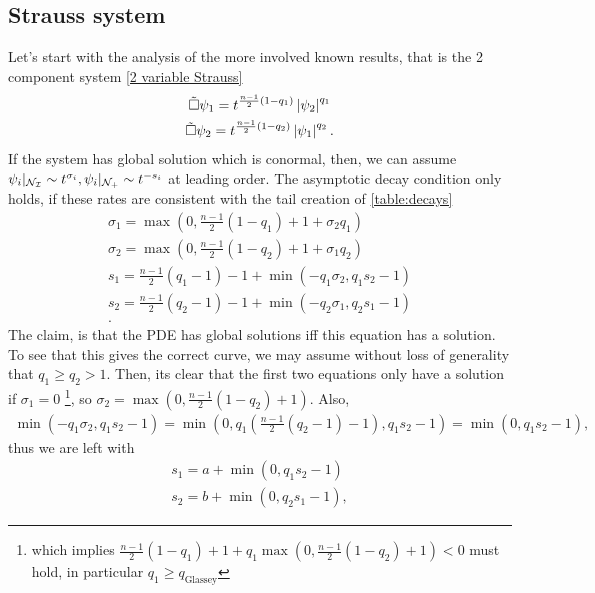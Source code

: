 \documentclass[11pt, oneside]{amsart}
\begin{document}
	\subsection{Strauss system}\label{strauss system}
	Let's start with the analysis of the more involved known results, that is the 2 component system \cref{2 variable Strauss}
	\begin{equation*}
		\begin{gathered}
			\tilde{\Box}\psi_1=t^{\frac{n-1}{2}(1-q_1)}\left\lvert \psi_2\right\rvert^{q_1}\\
			\tilde{\Box}\psi_2=t^{\frac{n-1}{2}(1-q_2)}\left\lvert \psi_1\right\rvert^{q_2}.
		\end{gathered}
	\end{equation*}
	If the system has global solution which is conormal, then, we can assume $\psi_i|_{\mathcal{N}_{\mathcal{I}}}\sim t^{\sigma_i},\psi_i|_{\mathcal{N}_+}\sim t^{-s_i}$ at leading order. The asymptotic decay condition only holds, if these rates are consistent with the tail creation of \cref{table:decays}
	\begin{equation*}
		\begin{gathered}
			\sigma_1=\max(0,\frac{n-1}{2}(1-q_1)+1+\sigma_2q_1)\\
			\sigma_2=\max(0,\frac{n-1}{2}(1-q_2)+1+\sigma_1q_2)\\
			s_1=\frac{n-1}{2}(q_1-1)-1+\min(-q_1\sigma_2,q_1s_2-1)\\
			s_2=\frac{n-1}{2}(q_2-1)-1+\min(-q_2\sigma_1,q_2s_1-1)\\.
		\end{gathered}
	\end{equation*}
	The claim, is that the PDE has global solutions iff this equation has a solution. To see that this gives the correct curve, we may assume without loss of generality that $q_1\geq q_2>1$. Then, its clear that the first two equations only have a solution if $\sigma_1=0$ \footnote{which implies  $\frac{n-1}{2}(1-q_1)+1+q_1\max(0,\frac{n-1}{2}(1-q_2)+1)<0$ must hold, in particular $q_1\geq q_{\text{Glassey}}$}, so $\sigma_2=\max(0,\frac{n-1}{2}(1-q_2)+1)$. Also,
	\begin{equation*}
		\begin{gathered}
			\min(-q_1\sigma_2,q_1s_2-1)=\min(0,q_1(\frac{n-1}{2}(q_2-1)-1),q_1s_2-1)=\min(0,q_1s_2-1),
		\end{gathered}
	\end{equation*}
	thus we are left with
	\begin{equation*}
		\begin{gathered}
			s_1=a+\min(0,q_1s_2-1)\\
			s_2=b+\min(0,q_2s_1-1),
		\end{gathered}
	\end{equation*}
\end{document}
